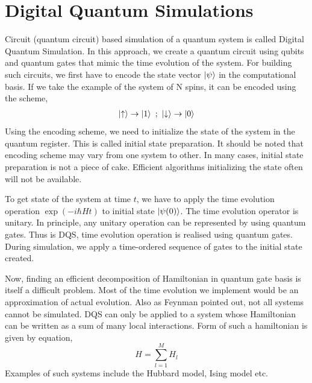 \documentclass[12pt,a4paper]{report}
\begin{document}
\section{Digital Quantum Simulations}
Circuit (quantum circuit) based simulation  of a quantum system is called Digital Quantum Simulation. In this approach, we create a quantum circuit using qubits and quantum gates that mimic the time evolution of the system. For building such circuits, we first have to encode the state vector $\ket{\psi}$ in the computational basis. If we take the example of the system of N spins, it can be encoded using the scheme,
\begin{gather*}
\ket{\uparrow} \rightarrow \ket{1} \ ; \ \ket{\downarrow} \rightarrow \ket{0}
\end{gather*}
Using the encoding scheme, we need to initialize the state of the system in the quantum register. This is called initial state preparation. It should be noted that encoding scheme may vary from one system to other. In many cases, initial state preparation is not a piece of cake. Efficient algorithms initializing the state often will not be available. %
 
To get state of the system at time $t$, we have to apply the time evolution operation $\exp(-i\hbar Ht)$ to initial state $\ket{\psi (0)}$. The time evolution operator is unitary. In principle, any unitary operation can be represented by using quantum gates. Thus is DQS, time evolution operation is realised using quantum gates. During simulation, we apply a time-ordered sequence of gates to the initial state created.

Now, finding an efficient decomposition of Hamiltonian in quantum gate basis is itself a difficult problem. Most of the time evolution we implement would be an approximation of actual evolution. Also as Feynman pointed out, not all systems cannot be simulated. DQS can only be applied to a system whose Hamiltonian can be written as a sum of many local interactions. Form of such a hamiltonian is given by equation,
\begin{equation}
H= \sum_{l=1}^{M} H_{l}
\end{equation}
Examples of such systems include the Hubbard model, Ising model etc.
\end{document}
